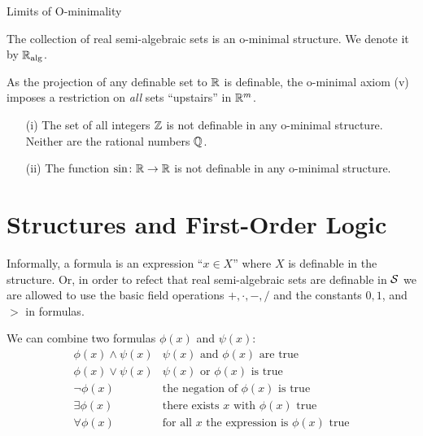 \documentclass{beamer}
\begin{document}
\begin{frame}{Limits of O-minimality}
  \begin{theorem}
    The collection of real semi-algebraic sets is an o-minimal
    structure. We denote it by ${\mathbb{R}}_{\mathrm{alg}}$. 
  \end{theorem}

  As the projection of any definable set to ${\mathbb{R}}$ is definable, the
  o-minimal axiom (v) imposes a restriction on \emph{all} sets
  ``upstairs'' in ${\mathbb{R}}^m$.

  \begin{example}
    \begin{enumerate}
    \item [(i)] The set of all integers ${\mathbb{Z}}$ is \alert{not} definable in any
      o-minimal structure. Neither are the rational numbers ${\mathbb{Q}}$.
    \item[(ii)] The function $\sin \colon{\mathbb{R}}\rightarrow{\mathbb{R}}$ is
      \alert{not} definable in any o-minimal structure. 
    \end{enumerate}
  \end{example}
\end{frame}

\section{Structures and First-Order Logic}
\begin{frame}
  Informally, a formula is an expression ``$x\in X$'' where $X$ is definable
  in the structure.
  Or,   in order to refect that real semi-algebraic sets are definable in
  ${\mathcal S}$ we are allowed to use the basic field operations $+,\cdot,-,/$
  and the constants $0,1$, and $>$ in formulas.
  
  We can combine two formulas $\phi(x)$ and $\psi(x)$:
  \begin{equation*}
    \begin{array}{ll}
      \phi(x) \wedge \psi(x) & \text{$\psi(x)$ and $\phi(x)$ are true}\\
     \phi(x) \vee \psi(x) & \text{$\psi(x)$ or $\phi(x)$  is true}\\
     \neg \phi(x)  & \text{the negation of $\phi(x)$ is true}\\
     \exists \phi(x) &\text{there exists $x$ with $\phi(x)$ true}\\
     \forall \phi(x) &\text{for all $x$ the expression is $\phi(x)$ true}
    \end{array}
  \end{equation*}
\end{frame}
\end{document}
